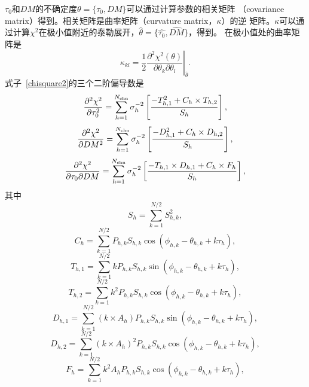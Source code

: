 $\tau_{0}$和$DM$的不确定度$\theta=\{\tau_0,DM\}$可以通过计算参数的相关矩阵
（covariance matrix）得到。相关矩阵是曲率矩阵（curvature matrix，$\kappa$）的逆
矩阵。$\kappa$可以通过计算$\chi^2$在极小值附近的泰勒展开，$\hat{\theta}=\{\hat{\tau_0},\hat{DM}\}$，得到。
%
在极小值处的曲率矩阵是
\begin{equation}
\kappa_{kl}=\left.\frac{1}{2}\frac{\partial^{2}\chi^{2}(\theta)}{\partial\theta_{k}\partial\theta_{l}}\right\rvert_{\hat{\theta}}.
\end{equation}
%
式子~\ref{chisquare2}的三个二阶偏导数是
%
\begin{equation}
\label{eq7}
\frac{\partial^2\chi^2}{\partial \tau_{0}^{2}}=\sum_{h=1}^{N_{\rm{chn}}}\sigma_{h}^{-2}\left[\frac{-T_{h,1}^{2}+C_{h}\times T_{h,2}}{S_{h}}\right],
\end{equation}
%
\begin{equation}
\frac{\partial^2\chi^2}{\partial DM^{2}}=\sum_{h=1}^{N_{\rm{chn}}}\sigma_{h}^{-2}\left[\frac{-D_{h,1}^{2}+C_{h}\times D_{h,2}}{S_{h}}\right],
\end{equation}
%
\begin{equation}
\label{eq9}
\frac{\partial^2\chi^2}{\partial \tau_{0} \partial DM}=\sum_{h=1}^{N_{\rm{chn}}}\sigma_{h}^{-2}\left[\frac{-T_{h,1}\times D_{h,1}+C_{h}\times F_{h}}{S_{h}}\right],
\end{equation}
%
其中
\begin{equation}
S_{h}=\sum_{k=1}^{N/2}S_{h,k}^2,
\end{equation}
\begin{equation}
C_{h}=\sum_{k=1}^{N/2}P_{h,k}S_{h,k}\cos(\phi_{h,k}-\theta_{h,k}+k\tau_{h}),
\end{equation}
\begin{equation}
T_{h,1}=\sum_{k=1}^{N/2}kP_{h,k}S_{h,k}\sin(\phi_{h,k}-\theta_{h,k}+k\tau_{h}),
\end{equation}
\begin{equation}
T_{h,2}=\sum_{k=1}^{N/2}k^{2}P_{h,k}S_{h,k}\cos(\phi_{h,k}-\theta_{h,k}+k\tau_{h}),
\end{equation}
\begin{equation}
D_{h,1}=\sum_{k=1}^{N/2}(k\times A_{h})P_{h,k}S_{h,k}\sin(\phi_{h,k}-\theta_{h,k}+k\tau_{h}),
\end{equation}
\begin{equation}
D_{h,2}=\sum_{k=1}^{N/2}(k\times A_{h})^{2}P_{h,k}S_{h,k}\cos(\phi_{h,k}-\theta_{h,k}+k\tau_{h}),
\end{equation}
\begin{equation}
F_{h}=\sum_{k=1}^{N/2}k^{2}A_{h}P_{h,k}S_{h,k}\cos(\phi_{h,k}-\theta_{h,k}+k\tau_{h}),
\end{equation}

